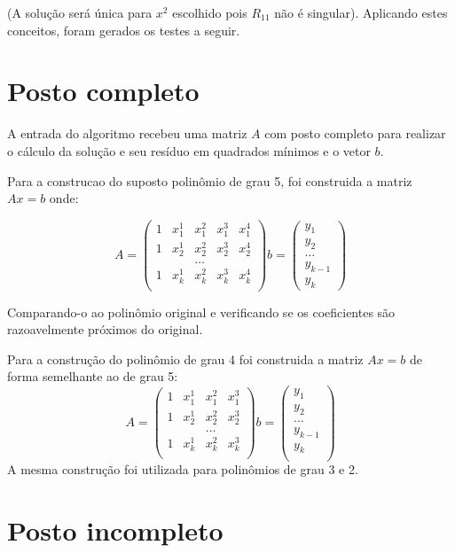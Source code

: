 (A solução será única para $x^2$ escolhido pois $R_{11}$ não é singular).
Aplicando estes conceitos, foram gerados os testes a seguir.


\section{Posto completo}
A entrada do algoritmo recebeu uma matriz $A$ com posto completo para realizar
o cálculo da solução e seu resíduo em quadrados mínimos e o vetor $b$.

Para a construcao do suposto polinômio de grau 5, foi construida a matriz $Ax = b$
onde:

\[
A =	\left(
\begin{array}{ccccc} 
1&	x_1^1&	x_1^2&	x_1^3&	x_1^4\\
1&	x_2^1&	x_2^2&	x_2^3&	x_2^4\\
&&\ldots\\
1&	x_k^1&	x_k^2&	x_k^3&	x_k^4\\
\end{array}
\right)
b =   
\left(
\begin{array}{c}
y_1\\
y_2\\
\ldots\\
y_{k-1}\\
y_k 
\end{array}    
\right)
\]

Comparando-o ao polinômio original e verificando se os coeficientes 
são razoavelmente próximos do original.


Para a construção do polinômio de grau 4 foi construida a matriz $Ax = b$ de forma
semelhante ao de grau 5:
\[A =	
\left(
\begin{array}{cccc}
1 &	x_1^1 &	x_1^2 &	x_1^3\\
1 &	x_2^1 &	x_2^2 &	x_2^3\\
&&\dots          \\
1 &	x_k^1 &	x_k^2 &	x_k^3\\
\end{array} 
\right)
b =  
\left(
\begin{array}{c}
y_1\\
y_2\\
\ldots\\
y_{k-1}\\
y_k\\ 
\end{array}   
\right)
\]
A mesma construção foi utilizada para polinômios de grau 3 e 2.


\section{Posto incompleto}


